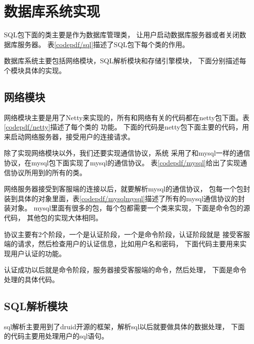 \section{数据库系统实现}
SQL包下面的类主要是作为数据库管理类，
让用户启动数据库服务器或者关闭数据库服务器。
表\ref{codepdf/sql}描述了SQL包下每个类的作用。

数据库系统主要包括网络模块，SQL解析模块和存储引擎模块，
下面分别描述每个模块具体的实现。
\subsection{网络模块}
网络模块主要是用了Netty来实现的，所有和网络有关的代码都在netty包下面。表\ref{codepdf/netty}描述了每个类的
功能。
下面的代码是netty包下面主要的代码，用来启动网络服务器，接受用户的连接请求。



除了实现网络模块以外，我们还要实现通信协议，系统
采用了和mysql一样的通信协议，在mysql包下面实现了mysql的通信协议。
表\ref{codepdf/mysql}给出了实现通信协议所用到的所有的类。

网络服务器接受到客服端的连接以后，就要解析mysql的通信协议，
包每一个包封装到具体的对象里面，表\ref{codepdf/mysqlmysql}描述了所有的mysql通信协议的封装对象。
mysql里面有很多的包，每个包都需要一个类来实现，下面是命令包的源代码，
其他包的实现大体相同。



协议主要有2个阶段，一个是认证阶段，一个是命令阶段，认证阶段就是
接受客服端的请求，然后检查用户的认证信息，比如用户名和密码，
下面代码主要用来实现用户认证的功能。



认证成功以后就是命令阶段，服务器接受客服端的命令，然后处理，
下面是命令处理的具体代码。


\subsection{SQL解析模块}
sql解析主要用到了druid开源的框架，解析sql以后就要做具体的数据处理，
下面的代码主要用处理用户的sql语句。



